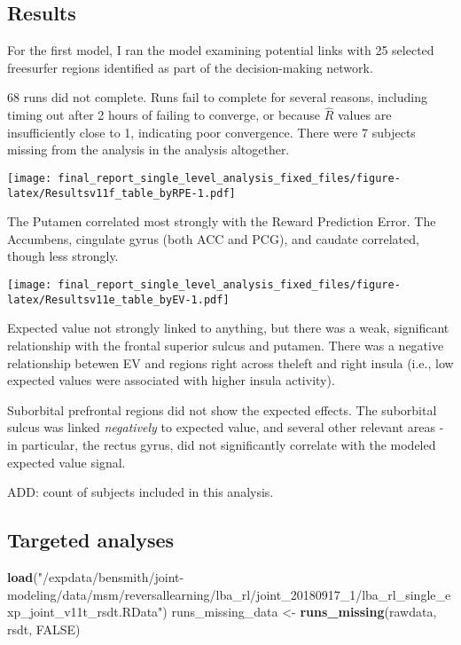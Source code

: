 \documentclass[]{article}
\newenvironment{Shaded}{\begin{snugshade}}{\end{snugshade}}
\newcommand{\KeywordTok}[1]{\textcolor[rgb]{0.13,0.29,0.53}{\textbf{{#1}}}}
\newcommand{\StringTok}[1]{\textcolor[rgb]{0.31,0.60,0.02}{{#1}}}
\newcommand{\OtherTok}[1]{\textcolor[rgb]{0.56,0.35,0.01}{{#1}}}
\newcommand{\NormalTok}[1]{{#1}}
\begin{document}
\subsection{Results}\label{results}

For the first model, I ran the model examining potential links with 25
selected freesurfer regions identified as part of the decision-making
network.

68 runs did not complete. Runs fail to complete for several reasons,
including timing out after 2 hours of failing to converge, or because
\(\hat{R}\) values are insufficiently close to 1, indicating poor
convergence. There were 7 subjects missing from the analysis in the
analysis altogether.

\texttt{[image: final\_report\_single\_level\_analysis\_fixed\_files/figure-latex/Resultsv11f\_table\_byRPE-1.pdf]}

The Putamen correlated most strongly with the Reward Prediction Error.
The Accumbens, cingulate gyrus (both ACC and PCG), and caudate
correlated, though less strongly.

\texttt{[image: final\_report\_single\_level\_analysis\_fixed\_files/figure-latex/Resultsv11e\_table\_byEV-1.pdf]}

Expected value not strongly linked to anything, but there was a weak,
significant relationship with the frontal superior sulcus and putamen.
There was a negative relationship betewen EV and regions right across
theleft and right insula (i.e., low expected values were associated with
higher insula activity).

Suborbital prefrontal regions did not show the expected effects. The
suborbital sulcus was linked \emph{negatively} to expected value, and
several other relevant areas - in particular, the rectus gyrus, did not
significantly correlate with the modeled expected value signal.

ADD: count of subjects included in this analysis.

\subsection{Targeted analyses}\label{targeted-analyses}

\begin{Shaded}
\begin{Highlighting}[]
\KeywordTok{load}\NormalTok{(}\StringTok{"/expdata/bensmith/joint-modeling/data/msm/reversallearning/lba_rl/joint_20180917_1/lba_rl_single_exp_joint_v11t_rsdt.RData"}\NormalTok{)}
\NormalTok{runs_missing_data <-}\StringTok{ }\KeywordTok{runs_missing}\NormalTok{(rawdata, rsdt, }\OtherTok{FALSE}\NormalTok{)}
\end{Highlighting}
\end{Shaded}
\end{document}
